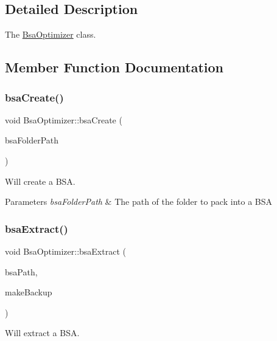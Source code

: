 \subsection{Detailed Description}
The \mbox{\hyperlink{class_bsa_optimizer}{Bsa\+Optimizer}} class. 

\subsection{Member Function Documentation}
\mbox{\label{class_bsa_optimizer_a4a89802c827b3f044a97287efaac6ef8}} 
\subsubsection{\texorpdfstring{bsaCreate()}{bsaCreate()}}
{\footnotesize\ttfamily void Bsa\+Optimizer\+::bsa\+Create (\begin{DoxyParamCaption}\item[{const Q\+String \&}]{bsa\+Folder\+Path }\end{DoxyParamCaption})}



Will create a B\+SA. 


\begin{DoxyParams}{Parameters}
{\em bsa\+Folder\+Path} & The path of the folder to pack into a B\+SA \\
\hline
\end{DoxyParams}
\mbox{\label{class_bsa_optimizer_a253e4302919422633f6a445306280528}} 
\subsubsection{\texorpdfstring{bsaExtract()}{bsaExtract()}}
{\footnotesize\ttfamily void Bsa\+Optimizer\+::bsa\+Extract (\begin{DoxyParamCaption}\item[{const Q\+String \&}]{bsa\+Path,  }\item[{bool}]{make\+Backup }\end{DoxyParamCaption})}



Will extract a B\+SA. 


